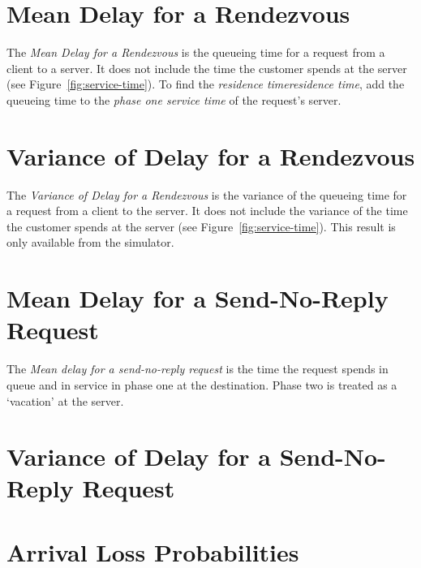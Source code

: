 \section{Mean Delay for a Rendezvous}
\label{sec:rendezvous-delay-out}

The \emph{Mean Delay for a Rendezvous} is the queueing
time for a request from a client to a server.  It
does not include the time the customer spends at the server (see
Figure~\ref{fig:service-time}).  To find the \emph{residence
  time}\emph{residence time}, add the queueing time to the \emph{phase
  one service time} of the request's
server.

\section{Variance of Delay for a Rendezvous}
\label{sec:rendezvous-variance-out}

The \emph{Variance of Delay for a Rendezvous} is the variance of the
queueing time for a request from a
client to the server.  It does not include the variance of the time
the customer spends at the server (see Figure~\ref{fig:service-time}).
This result is only available from the simulator.

\section{Mean Delay for a Send-No-Reply Request}
\label{sec:snr-delay-out}

The \emph{Mean delay for a send-no-reply request} is the time the
request spends in queue and in service in phase one at the
destination.  Phase two is treated as a `vacation' at the server.

\section{Variance of Delay for a Send-No-Reply Request}
\label{sec:snr-variance-out}

\section{Arrival Loss Probabilities}
\label{sec:arrival-loss}

